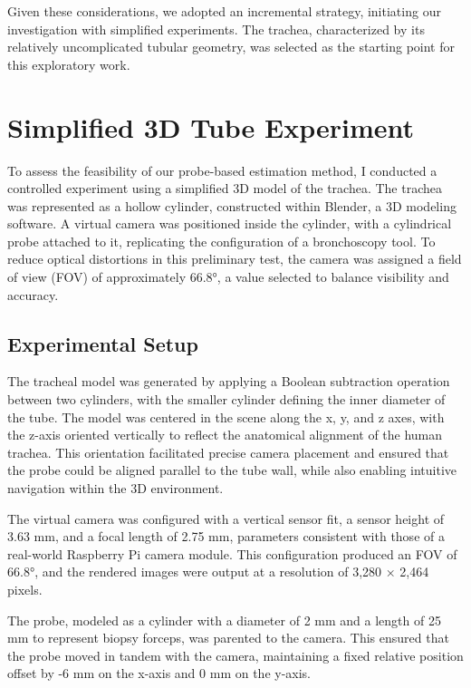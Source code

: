 Given these considerations, we adopted an incremental strategy, initiating our investigation with simplified experiments. The trachea, characterized by its relatively uncomplicated tubular geometry, was selected as the starting point for this exploratory work.

\section{Simplified 3D Tube Experiment}

To assess the feasibility of our probe-based estimation method, I conducted a controlled experiment using a simplified 3D model of the trachea. The trachea was represented as a hollow cylinder, constructed within Blender, a 3D modeling software. A virtual camera was positioned inside the cylinder, with a cylindrical probe attached to it, replicating the configuration of a bronchoscopy tool. To reduce optical distortions in this preliminary test, the camera was assigned a field of view (FOV) of approximately 66.8°, a value selected to balance visibility and accuracy.

\subsection{Experimental Setup}

The tracheal model was generated by applying a Boolean subtraction operation between two cylinders, with the smaller cylinder defining the inner diameter of the tube. The model was centered in the scene along the x, y, and z axes, with the z-axis oriented vertically to reflect the anatomical alignment of the human trachea. This orientation facilitated precise camera placement and ensured that the probe could be aligned parallel to the tube wall, while also enabling intuitive navigation within the 3D environment.

The virtual camera was configured with a vertical sensor fit, a sensor height of 3.63 mm, and a focal length of 2.75 mm, parameters consistent with those of a real-world Raspberry Pi camera module. This configuration produced an FOV of 66.8°, and the rendered images were output at a resolution of 3,280 × 2,464 pixels.

The probe, modeled as a cylinder with a diameter of 2 mm and a length of 25 mm to represent biopsy forceps, was parented to the camera. This ensured that the probe moved in tandem with the camera, maintaining a fixed relative position offset by -6 mm on the x-axis and 0 mm on the y-axis.

